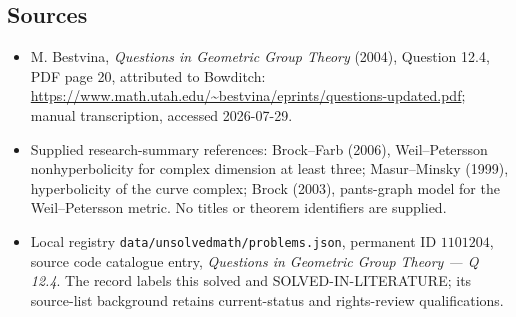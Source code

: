 \documentclass[11pt]{article}
\begin{document}
\subsection{Sources}
\begin{itemize}
\item M. Bestvina, \emph{Questions in Geometric Group Theory} (2004), Question 12.4, PDF page 20, attributed to Bowditch: \url{https://www.math.utah.edu/~bestvina/eprints/questions-updated.pdf}; manual transcription, accessed 2026-07-29.
\item Supplied research-summary references: Brock--Farb (2006), Weil--Petersson nonhyperbolicity for complex dimension at least three; Masur--Minsky (1999), hyperbolicity of the curve complex; Brock (2003), pants-graph model for the Weil--Petersson metric. No titles or theorem identifiers are supplied.
\item Local registry \texttt{data/unsolvedmath/problems.json}, permanent ID $1101204$, source code catalogue entry, \emph{Questions in Geometric Group Theory --- Q 12.4}. The record labels this solved and SOLVED-IN-LITERATURE; its source-list background retains current-status and rights-review qualifications.
\end{itemize}
\end{document}
